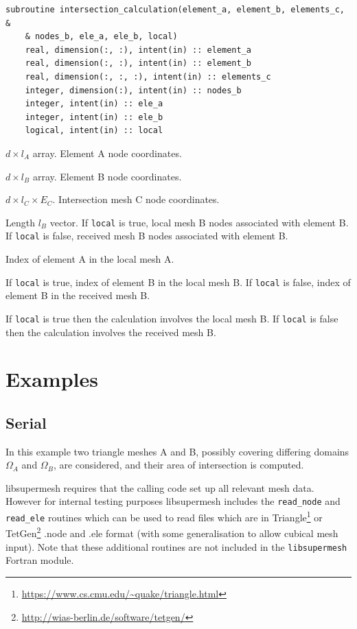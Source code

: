 \documentclass{article}
\begin{document}
\begin{lstlisting}[language=FORTRAN]
  subroutine intersection_calculation(element_a, element_b, elements_c, &
    & nodes_b, ele_a, ele_b, local)
    real, dimension(:, :), intent(in) :: element_a
    real, dimension(:, :), intent(in) :: element_b
    real, dimension(:, :, :), intent(in) :: elements_c
    integer, dimension(:), intent(in) :: nodes_b
    integer, intent(in) :: ele_a
    integer, intent(in) :: ele_b
    logical, intent(in) :: local
\end{lstlisting}

\begin{description}[font=\ttfamily\bfseries,leftmargin=2.2\parindent,labelindent=1.7\parindent,noitemsep]
  \item[element\_a] $d \times l_A$ array. Element A node coordinates.
  \item[element\_b] $d \times l_B$ array. Element B node coordinates.
  \item[elements\_c] $d \times l_C \times E_C$. Intersection mesh C node
    coordinates.
  \item[nodes\_b] Length $l_B$ vector. If \verb+local+ is true, local mesh B
    nodes associated with element B. If \verb+local+ is false, received mesh B
    nodes associated with element B.
  \item[ele\_a] Index of element A in the local mesh A.
  \item[ele\_b] If \verb+local+ is true, index of element B in the local mesh B.
    If \verb+local+ is false, index of element B in the received mesh B.
  \item[local] If \verb+local+ is true then the calculation involves the local
    mesh B. If \verb+local+ is false then the calculation involves the received
    mesh B.
\end{description}

\section{Examples}

\subsection{Serial}\label{sect:serial_example}

In this example two triangle meshes A and B, possibly covering differing domains
$\Omega_A$ and $\Omega_B$, are considered, and their area of intersection is
computed.

libsupermesh requires that the calling code set up all relevant mesh data.
However for internal testing purposes libsupermesh includes the \verb+read_node+
and \verb+read_ele+ routines which can be used to read files which are in
Triangle\footnote{\url{https://www.cs.cmu.edu/~quake/triangle.html}} or
TetGen\footnote{\url{http://wias-berlin.de/software/tetgen/}} .node and .ele
format (with some generalisation to allow cubical mesh input). Note that these
additional routines are not included in the \verb+libsupermesh+ Fortran module.
\end{document}

